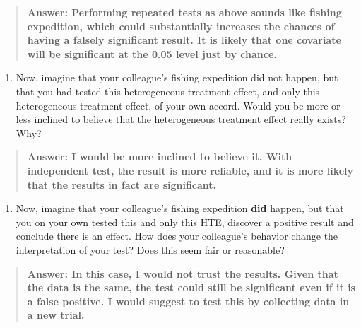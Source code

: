 \documentclass[
]{article}
\providecommand{\tightlist}{%
  \setlength{\itemsep}{0pt}\setlength{\parskip}{0pt}}
\begin{document}
\begin{quote}
\textbf{Answer: Performing repeated tests as above sounds like fishing
expedition, which could substantially increases the chances of having a
falsely significant result. It is likely that one covariate will be
significant at the 0.05 level just by chance. }
\end{quote}

\begin{enumerate}
\def\labelenumi{\arabic{enumi}.}
\setcounter{enumi}{8}
\tightlist
\item
  Now, imagine that your colleague's fishing expedition did not happen,
  but that you had tested this heterogeneous treatment effect, and only
  this heterogeneous treatment effect, of your own accord. Would you be
  more or less inclined to believe that the heterogeneous treatment
  effect really exists? Why?
\end{enumerate}

\begin{quote}
\textbf{Answer: I would be more inclined to believe it. With independent
test, the result is more reliable, and it is more likely that the
results in fact are significant. }
\end{quote}

\begin{enumerate}
\def\labelenumi{\arabic{enumi}.}
\setcounter{enumi}{9}
\tightlist
\item
  Now, imagine that your colleague's fishing expedition \textbf{did}
  happen, but that you on your own tested this and only this HTE,
  discover a positive result and conclude there is an effect. How does
  your colleague's behavior change the interpretation of your test? Does
  this seem fair or reasonable?
\end{enumerate}

\begin{quote}
\textbf{Answer: In this case, I would not trust the results. Given that
the data is the same, the test could still be significant even if it is
a false positive. I would suggest to test this by collecting data in a
new trial.}
\end{quote}
\end{document}
